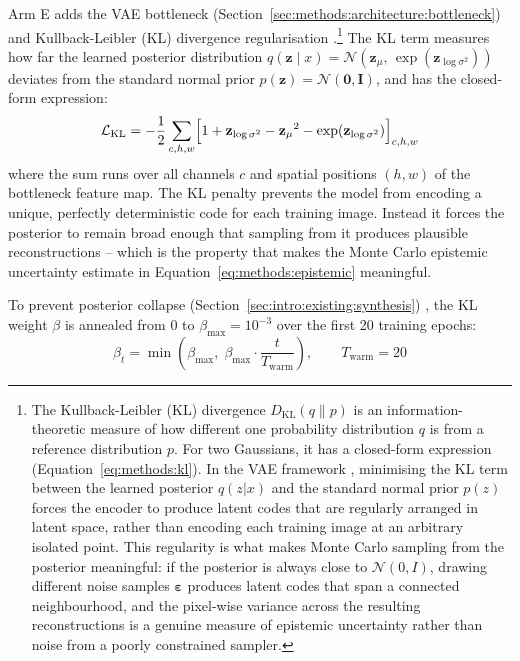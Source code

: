 \documentclass[12pt, a4paper, twoside, openright]{book}
\begin{document}
Arm E adds the VAE bottleneck (Section~\ref{sec:methods:architecture:bottleneck}) and Kullback-Leibler (KL) divergence regularisation \cite{kullback_information_1951}.\footnote{The Kullback-Leibler (KL) divergence $D_{\mathrm{KL}}(q \| p)$ is an information-theoretic measure of how different one probability distribution $q$ is from a reference distribution $p$. For two Gaussians, it has a closed-form expression (Equation~\ref{eq:methods:kl}). In the VAE framework \cite{kingma_auto-encoding_2014}, minimising the KL term between the learned posterior $q(z|x)$ and the standard normal prior $p(z)$ forces the encoder to produce latent codes that are regularly arranged in latent space, rather than encoding each training image at an arbitrary isolated point. This regularity is what makes Monte Carlo sampling from the posterior meaningful: if the posterior is always close to $\mathcal{N}(0,I)$, drawing different noise samples $\boldsymbol{\varepsilon}$ produces latent codes that span a connected neighbourhood, and the pixel-wise variance across the resulting reconstructions is a genuine measure of epistemic uncertainty rather than noise from a poorly constrained sampler.} The KL term measures how far the learned posterior
distribution $q(\mathbf{z} \mid x) = \mathcal{N}(\mathbf{z}_\mu,\,\exp(\mathbf{z}_{\log\sigma^2}))$
deviates from the standard normal prior $p(\mathbf{z}) = \mathcal{N}(\mathbf{0}, \mathbf{I})$,
and has the closed-form expression:
\begin{equation}
\label{eq:methods:kl}
\mathcal{L}_{\mathrm{KL}} = -\frac{1}{2}\sum_{c,h,w}
  \Bigl[1 + {\mathbf{z}_{\log\sigma^2}} - {\mathbf{z}_\mu}^2
  - \exp({\mathbf{z}_{\log\sigma^2}})\Bigr]_{c,h,w}
\end{equation}
where the sum runs over all channels $c$ and spatial positions $(h,w)$ of the bottleneck
feature map. The KL penalty prevents the model from encoding a unique, perfectly
deterministic code for each training image. Instead it forces the posterior to remain broad
enough that sampling from it produces plausible reconstructions -- which is the property
that makes the Monte Carlo epistemic uncertainty estimate in
Equation~\ref{eq:methods:epistemic} meaningful.

To prevent posterior collapse (Section~\ref{sec:intro:existing:synthesis}) \cite{fu_cyclical_2019, bowman_generating_2016}, the KL weight $\beta$ is annealed from 0 to $\beta_{\max} = 10^{-3}$
over the first 20 training epochs:
\begin{equation}
\label{eq:methods:beta}
\beta_t = \min\!\left(\beta_{\max},\; \beta_{\max} \cdot \frac{t}{T_{\mathrm{warm}}}\right),
\qquad T_{\mathrm{warm}} = 20
\end{equation}
\end{document}
